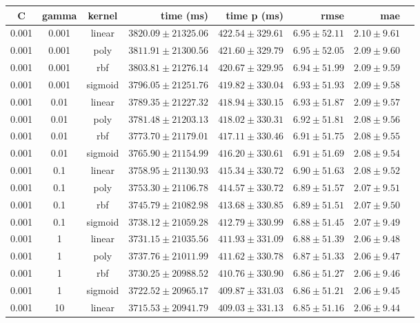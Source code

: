 \begin{tabular}{cccrrrrr}
\toprule
\textbf{C} & \textbf{gamma} & \textbf{kernel} & \textbf{time (ms)} & \textbf{time p (ms)} & \textbf{rmse} & \textbf{mae}\\
\midrule
0.001 & 0.001 & linear & $3820.09 \pm 21325.06$ & $422.54 \pm 329.61$ & $6.95 \pm 52.11$ & $2.10 \pm 9.61$\\
0.001 & 0.001 & poly & $3811.91 \pm 21300.56$ & $421.60 \pm 329.79$ & $6.95 \pm 52.05$ & $2.09 \pm 9.60$\\
0.001 & 0.001 & rbf & $3803.81 \pm 21276.14$ & $420.67 \pm 329.95$ & $6.94 \pm 51.99$ & $2.09 \pm 9.59$\\
0.001 & 0.001 & sigmoid & $3796.05 \pm 21251.76$ & $419.82 \pm 330.04$ & $6.93 \pm 51.93$ & $2.09 \pm 9.58$\\
0.001 & 0.01 & linear & $3789.35 \pm 21227.32$ & $418.94 \pm 330.15$ & $6.93 \pm 51.87$ & $2.09 \pm 9.57$\\
0.001 & 0.01 & poly & $3781.48 \pm 21203.13$ & $418.02 \pm 330.31$ & $6.92 \pm 51.81$ & $2.08 \pm 9.56$\\
0.001 & 0.01 & rbf & $3773.70 \pm 21179.01$ & $417.11 \pm 330.46$ & $6.91 \pm 51.75$ & $2.08 \pm 9.55$\\
0.001 & 0.01 & sigmoid & $3765.90 \pm 21154.99$ & $416.20 \pm 330.61$ & $6.91 \pm 51.69$ & $2.08 \pm 9.54$\\
0.001 & 0.1 & linear & $3758.95 \pm 21130.93$ & $415.34 \pm 330.72$ & $6.90 \pm 51.63$ & $2.08 \pm 9.52$\\
0.001 & 0.1 & poly & $3753.30 \pm 21106.78$ & $414.57 \pm 330.72$ & $6.89 \pm 51.57$ & $2.07 \pm 9.51$\\
0.001 & 0.1 & rbf & $3745.79 \pm 21082.98$ & $413.68 \pm 330.85$ & $6.89 \pm 51.51$ & $2.07 \pm 9.50$\\
0.001 & 0.1 & sigmoid & $3738.12 \pm 21059.28$ & $412.79 \pm 330.99$ & $6.88 \pm 51.45$ & $2.07 \pm 9.49$\\
0.001 & 1 & linear & $3731.15 \pm 21035.56$ & $411.93 \pm 331.09$ & $6.88 \pm 51.39$ & $2.06 \pm 9.48$\\
0.001 & 1 & poly & $3737.76 \pm 21011.99$ & $411.62 \pm 330.78$ & $6.87 \pm 51.33$ & $2.06 \pm 9.47$\\
0.001 & 1 & rbf & $3730.25 \pm 20988.52$ & $410.76 \pm 330.90$ & $6.86 \pm 51.27$ & $2.06 \pm 9.46$\\
0.001 & 1 & sigmoid & $3722.52 \pm 20965.17$ & $409.87 \pm 331.03$ & $6.86 \pm 51.21$ & $2.06 \pm 9.45$\\
0.001 & 10 & linear & $3715.53 \pm 20941.79$ & $409.03 \pm 331.13$ & $6.85 \pm 51.16$ & $2.06 \pm 9.44$\\

\end{tabular}
